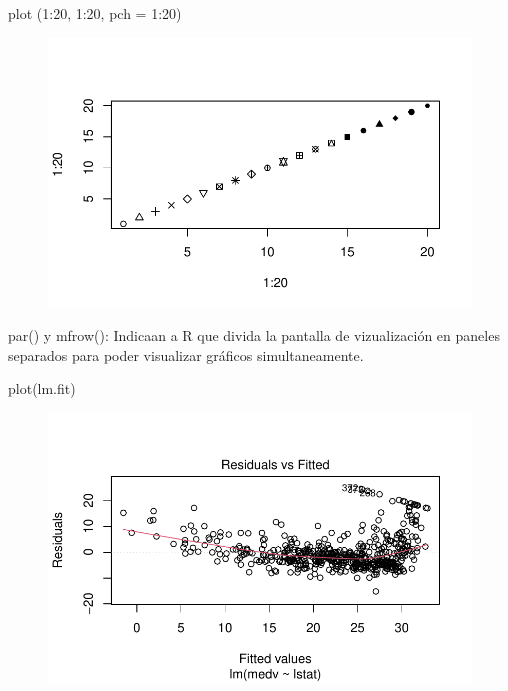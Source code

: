 \documentclass[
  letterpaper,
  DIV=11,
  numbers=noendperiod]{scrartcl}
\newenvironment{Shaded}{\begin{snugshade}}{\end{snugshade}}
\newcommand{\AttributeTok}[1]{\textcolor[rgb]{0.40,0.45,0.13}{#1}}
\newcommand{\DecValTok}[1]{\textcolor[rgb]{0.68,0.00,0.00}{#1}}
\newcommand{\FunctionTok}[1]{\textcolor[rgb]{0.28,0.35,0.67}{#1}}
\newcommand{\NormalTok}[1]{\textcolor[rgb]{0.00,0.23,0.31}{#1}}
\newcommand{\SpecialCharTok}[1]{\textcolor[rgb]{0.37,0.37,0.37}{#1}}
\begin{document}
\begin{Shaded}
\begin{Highlighting}[]
\FunctionTok{plot}\NormalTok{ (}\DecValTok{1}\SpecialCharTok{:}\DecValTok{20}\NormalTok{, }\DecValTok{1}\SpecialCharTok{:}\DecValTok{20}\NormalTok{, }\AttributeTok{pch =} \DecValTok{1}\SpecialCharTok{:}\DecValTok{20}\NormalTok{)}
\end{Highlighting}
\end{Shaded}

\begin{figure}[H]

{\centering \includegraphics{Resumen-2---3_files/figure-pdf/unnamed-chunk-9-5.pdf}

}

\end{figure}

par() y mfrow(): Indicaan a R que divida la pantalla de vizualización en
paneles separados para poder visualizar gráficos simultaneamente.

\begin{Shaded}
\begin{Highlighting}[]
\FunctionTok{plot}\NormalTok{(lm.fit)}
\end{Highlighting}
\end{Shaded}

\begin{figure}[H]

{\centering \includegraphics{Resumen-2---3_files/figure-pdf/unnamed-chunk-10-1.pdf}

}

\end{figure}
\end{document}

